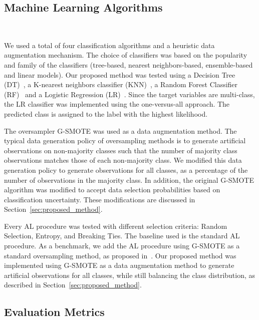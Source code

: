 \documentclass[10pt,journal,compsoc]{IEEEtran}
\begin{document}
\subsection{Machine Learning Algorithms}~\label{sec:machine_learning_algorithms}

We used a total of four classification algorithms and a heuristic data
augmentation mechanism. The choice of classifiers was based on the popularity
and family of the classifiers (tree-based, nearest neighbors-based,
ensemble-based and linear models). Our proposed method was tested using a
Decision Tree (DT)~\cite{Wu1975}, a K-nearest neighbors classifier
(KNN)~\cite{Cover1967}, a Random Forest Classifier (RF)~\cite{Ho1995} and a
Logistic Regression (LR)~\cite{Nelder1972}. Since the target variables are
multi-class, the LR classifier was implemented using the one-versus-all
approach. The predicted class is assigned to the label with the highest
likelihood.
 
The oversampler G-SMOTE was used as a data augmentation method. The typical
data generation policy of oversampling methods is to generate artificial
observations on non-majority classes such that the number of majority class
observations matches those of each non-majority class. We modified this data
generation policy to generate observations for all classes, as a percentage of
the number of observations in the majority class. In addition, the original
G-SMOTE algorithm was modified to accept data selection probabilities based on
classification uncertainty. These modifications are discussed in
Section~\ref{sec:proposed_method}.

Every AL procedure was tested with different selection criteria: Random
Selection, Entropy, and Breaking Ties. The baseline used is the standard AL
procedure. As a benchmark, we add the AL procedure using G-SMOTE as a standard
oversampling method, as proposed in~\cite{Fonseca2021}. Our proposed method
was implemented using G-SMOTE as a data augmentation method to generate
artificial observations for all classes, while still balancing the class
distribution, as described in Section~\ref{sec:proposed_method}. 
 
\subsection{Evaluation Metrics}~\label{sec:evaluation_metrics}
\end{document}
